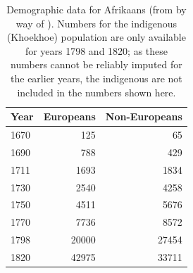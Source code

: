 \begin{table}
\caption{Demographic data for Afrikaans (from \cite{GilElph1979} by way of \cite{Kauhanen2022}). Numbers for the indigenous (Khoekhoe) population are only available for years 1798 and 1820; as these numbers cannot be reliably imputed for the earlier years, the indigenous are not included in the numbers shown here.}\label{tbl:data-afrikaans}
\begin{tabular}{lrr}
\toprule
Year & Europeans & Non-Europeans\\
\midrule
1670 & 125 & 65\\
1690 & 788 & 429\\
1711 & 1693 & 1834\\
1730 & 2540 & 4258\\
1750 & 4511 & 5676\\
1770 & 7736 & 8572\\
1798 & 20000 & 27454\\
1820 & 42975 & 33711\\
\bottomrule
\end{tabular}
\end{table}
